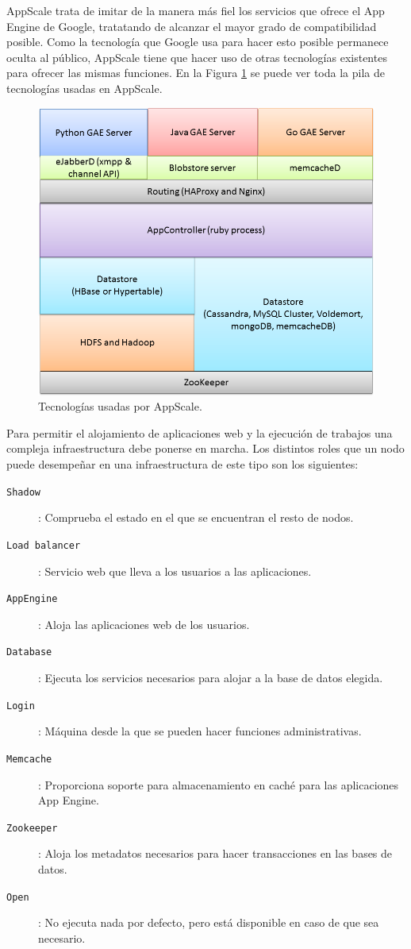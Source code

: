 AppScale trata de imitar de la manera más fiel los servicios que ofrece el App Engine de Google, tratatando de alcanzar el mayor grado de compatibilidad posible. Como la tecnología que Google usa para hacer esto posible permanece oculta al público, AppScale tiene que hacer uso de otras tecnologías existentes para ofrecer las mismas funciones. En la Figura \ref{figure:tecnologias-appscale} se puede ver toda la pila de tecnologías usadas en AppScale.

\begin{figure} [!htbp]
  \centering
  \includegraphics[width=13.5cm]{imagenes/AppScale_Stack.png}
  \caption{Tecnologías usadas por AppScale.}
\label{figure:tecnologias-appscale}
\end{figure}

Para permitir el alojamiento de aplicaciones web y la ejecución de trabajos una compleja infraestructura debe ponerse en marcha. Los distintos roles que un nodo puede desempeñar en una infraestructura de este tipo son los siguientes:

\begin{description}
\item[\texttt{Shadow}]: Comprueba el estado en el que se encuentran el resto de nodos.
\item[\texttt{Load balancer}]: Servicio web que lleva a los usuarios a las aplicaciones.
\item[\texttt{AppEngine}]: Aloja las aplicaciones web de los usuarios.
\item[\texttt{Database}]: Ejecuta los servicios necesarios para alojar a la base de datos elegida.
\item[\texttt{Login}]: Máquina desde la que se pueden hacer funciones administrativas.
\item[\texttt{Memcache}]: Proporciona soporte para almacenamiento en caché para las aplicaciones App Engine.
\item[\texttt{Zookeeper}]: Aloja los metadatos necesarios para hacer transacciones en las bases de datos.
\item[\texttt{Open}]: No ejecuta nada por defecto, pero está disponible en caso de que sea necesario.
\end{description}

